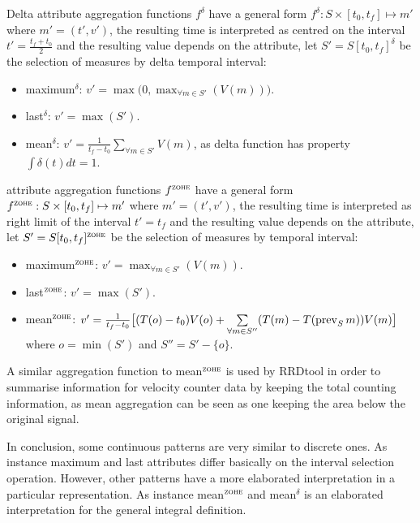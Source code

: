 Delta attribute aggregation functions $f^\delta$ have a general form
$f^\delta : S \times [t_0,t_f]\mapsto m'$ where $m'=(t',v')$, the
resulting time is interpreted as centred on the interval
$t'=\frac{t_f+t_0}{2}$ and the resulting value depends on the
attribute, let $S'=S[t_0,t_f]^\delta$ be the selection of measures by
delta temporal interval:
\begin{itemize}
\item maximum$^\delta$: $v' = \max\big(0,\max_{\forall m \in S'}(V(m))\big)$. 
\item last$^\delta$: $v' = \max(S')$.
\item mean$^\delta$: $v' = \frac{1}{t_f-t_0} \sum\limits_{\forall m
    \in S'} V(m)$, as delta function has property $\int\delta(t)dt=1$.
\end{itemize}


\zohe{} attribute aggregation functions $f^\zohe{}$ have a general
form $f^\zohe{} : S \times [t_0,t_f]\mapsto m'$ where $m'=(t',v')$,
the resulting time is interpreted as right limit of the interval
$t'=t_f$ and the resulting value depends on the attribute, let
$S'=S[t_0,t_f]^\zohe{}$ be the selection of measures by \zohe{} temporal
interval:
\begin{itemize}
\item maximum$^\zohe{}$: $v' = \max_{\forall m \in S'}(V(m))$. 
\item last$^\zohe{}$: $v' = \max(S')$.
\item mean$^\zohe{}$: $v' = \frac{1}{t_f-t_0} \big[ (T(o)-t_0)V(o) +
  \sum\limits_{\forall m \in S''}( T(m)- T(\operatorname*{prev}_S
  m) )V(m) \big]$ where $o=\min(S')$ and $S''= S' - \{o\}$.
\end{itemize}

A similar aggregation function to mean$^\zohe{}$ is used by RRDtool
\cite{rrdtool} in order to summarise information for velocity counter
data by keeping the total counting information, as mean aggregation
can be seen as one keeping the area below the original signal.


In conclusion, some continuous patterns are very similar to discrete
ones. As instance maximum and last attributes differ basically on the
interval selection operation. However, other patterns have a more
elaborated interpretation in a particular representation. As instance
mean$^\zohe{}$ and mean$^\delta$ is an elaborated interpretation for
the general integral definition.





